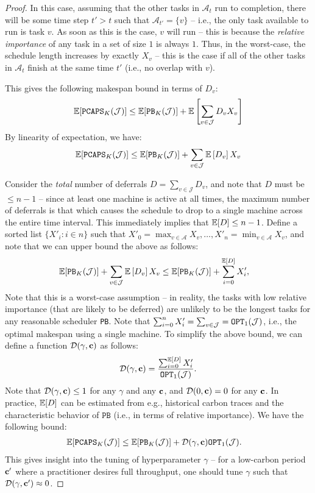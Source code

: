 \begin{proof}
In this case, assuming that the other tasks in $\mathcal{A}_t$ run to completion, there will be some time step $t' > t$ such that $\mathcal{A}_{t'} = \{ v \}$ -- i.e., the only task available to run is task $v$.  As soon as this is the case, $v$ will run -- this is because the \textit{relative importance} of any task in a set of size $1$ is always $1$.  Thus, in the worst-case, the schedule length increases by exactly $X_v$ -- this is the case if all of the other tasks in $\mathcal{A}_t$ finish at the same time $t'$ (i.e., no overlap with $v$).

This gives the following makespan bound in terms of $D_{v}$:
\[
\mathbb{E} [ \texttt{PCAPS}_K(\mathcal{J}) ] \le \mathbb{E} [ \texttt{PB}_K(\mathcal{J}) ] + \mathbb{E} \left[ \sum_{v \in \mathcal{J}} D_v X_v \right]
\]
By linearity of expectation, we have:
\[
\mathbb{E} [ \texttt{PCAPS}_K(\mathcal{J}) ] \le \mathbb{E} [ \texttt{PB}_K(\mathcal{J}) ] + \sum_{v \in \mathcal{J}} \mathbb{E} \left[ D_v \right] X_v
\]

Consider the \textit{total} number of deferrals $D = \sum_{v \in \mathcal{J}} D_v$, and note that $D$ must be $\leq n-1$ -- since at least one machine is active at all times, the maximum number of deferrals is that which causes the schedule to drop to a single machine across the entire time interval.  This immediately implies that $\mathbb{E}[D] \leq n-1$.
Define a sorted list $\{ X'_i : i \in n\}$ such that $X'_0 = \max_{v \in \mathcal{A}} X_v, \dots, X'_n = \min_{v \in \mathcal{A}} X_v$, and note that we can upper bound the above as follows:
\begin{align*}
\mathbb{E} [ \texttt{PB}_K(\mathcal{J}) ] + \sum_{v \in \mathcal{J}} \mathbb{E} \left[ D_v \right] X_v &\le \mathbb{E} [ \texttt{PB}_K(\mathcal{J}) ] + \sum_{i=0}^{\mathbb{E}[D]} X'_i,
\end{align*}
Note that this is a worst-case assumption -- in reality, the tasks with low relative importance (that are likely to be deferred) are unlikely to be the longest tasks for any reasonable scheduler \texttt{PB}.
Note that $\sum_{i=0}^n X'_i = \sum_{v \in \mathcal{J}} = \texttt{OPT}_1(\mathcal{J})$, i.e., the optimal makespan using a single machine.  To simplify the above bound, we can define a function $\mathcal{D}(\gamma, {\mathbf{c}})$ as follows:
\[
\mathcal{D}(\gamma, {\mathbf{c}}) = \frac{\sum_{i=0}^{\mathbb{E}[D]} X'_i}{\texttt{OPT}_1(\mathcal{J})}.
\]
Note that $\mathcal{D}(\gamma, {\mathbf{c}}) \le 1$ for any $\gamma$ and any ${\mathbf{c}}$, and $\mathcal{D}(0, {\mathbf{c}}) = 0$ for any ${\mathbf{c}}$.  In practice, $\mathbb{E} [D]$ can be estimated from e.g., historical carbon traces and the characteristic behavior of $\texttt{PB}$ (i.e., in terms of relative importance).
We have the following bound:
\begin{align*}
\mathbb{E} [ \texttt{PCAPS}_K(\mathcal{J}) ] &\le \mathbb{E} [ \texttt{PB}_K(\mathcal{J}) ] +  \mathcal{D}(\gamma, {\mathbf{c}}) \texttt{OPT}_1(\mathcal{J}).
\end{align*}
This gives insight into the tuning of hyperparameter $\gamma$ -- for a low-carbon period ${\mathbf{c}}'$ where a practitioner desires full throughput, one should tune $\gamma$ such that $\mathcal{D}(\gamma, {\mathbf{c'}}) \approx 0$.


\end{proof}
